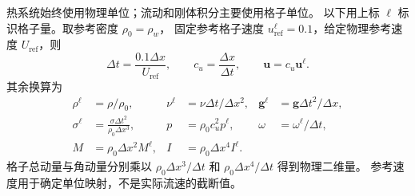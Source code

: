 热系统始终使用物理单位；流动和刚体积分主要使用格子单位。
以下用上标 $\ell$ 标识格子量。取参考密度 $\rho_0=\rho_w$，
固定参考格子速度 $u_{\mathrm{ref}}^\ell=0.1$，给定物理参考速度 $U_{\mathrm{ref}}$，则
\begin{equation}
 \Delta t=\frac{0.1\Delta x}{U_{\mathrm{ref}}},\qquad
 c_u=\frac{\Delta x}{\Delta t},\qquad
 \bm u=c_u\bm u^\ell.
 \label{eq:scales}
\end{equation}
其余换算为
\begin{align}
 \rho^\ell&=\rho/\rho_0,&
 \nu^\ell&=\nu\Delta t/\Delta x^2,&
 \bm g^\ell&=\bm g\Delta t^2/\Delta x,\\
 \sigma^\ell&=\frac{\sigma\Delta t^2}{\rho_0\Delta x^3},&
 p&=\rho_0 c_u^2 p^\ell,&
 \omega&=\omega^\ell/\Delta t,\\
 M&=\rho_0\Delta x^2 M^\ell,&
 I&=\rho_0\Delta x^4 I^\ell.&
\end{align}
格子总动量与角动量分别乘以
$\rho_0\Delta x^3/\Delta t$ 和 $\rho_0\Delta x^4/\Delta t$ 得到物理二维量。
参考速度用于确定单位映射，不是实际流速的截断值。


